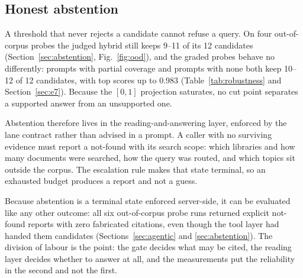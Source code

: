 \subsection{Honest abstention}

A threshold that never rejects a candidate cannot refuse a query. On four
out-of-corpus probes the judged hybrid still keeps 9--11 of its 12 candidates
(Section~\ref{sec:abstention}, Fig.~\ref{fig:ood}), and the graded probes behave
no differently: prompts with partial coverage and prompts with none both keep
10--12 of 12 candidates, with top scores up to 0.983
(Table~\ref{tab:robustness} and Section~\ref{sec:e7}). Because the $[0,1]$ projection saturates, no cut
point separates a supported answer from an unsupported one.

Abstention therefore lives in the reading-and-answering layer, enforced by the
lane contract rather than advised in a prompt. A caller with no surviving
evidence must report a not-found with its search scope: which libraries and how
many documents were searched, how the query was routed, and which topics sit
outside the corpus. The escalation rule makes that state terminal, so an
exhausted budget produces a report and not a guess.

Because abstention is a terminal state enforced server-side, it can be evaluated
like any other outcome: all six out-of-corpus probe runs returned explicit
not-found reports with zero fabricated citations, even though the tool layer had
handed them candidates (Sections~\ref{sec:agentic} and \ref{sec:abstention}). The
division of labour is the point: the gate decides what may be cited, the reading
layer decides whether to answer at all, and the measurements put the reliability
in the second and not the first.
